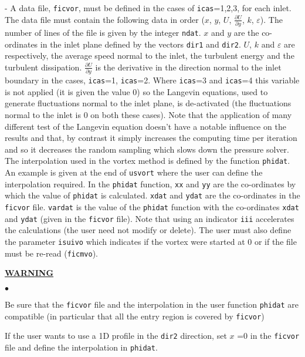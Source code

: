 {{{\begin{list}{-}{}
A data file, \texttt{ficvor}, must be defined in the cases of
\texttt{icas}=1,2,3, for each inlet. The data file must contain the following
data in order ($x$, $y$, $U$, $\displaystyle \frac{\partial U}
{\partial y}$, $k$, $\varepsilon$). The number of lines of the file is given by
the integer \texttt{ndat}. $x$ and $y$ are the co-ordinates in the inlet plane
defined by the vectors \texttt{dir1} and \texttt{dir2}. $U$, $k$ and
$\varepsilon$ are respectively, the average speed normal to the inlet,
the turbulent energy and the turbulent dissipation.
$\displaystyle \frac{\partial U}{\partial y}
$ is the derivative in the direction normal to the
 inlet boundary in the cases, \texttt{icas}=1, \texttt{icas}=2.
 Where \texttt{icas}=3 and \texttt{icas}=4 this variable is not applied
 (it is given the value 0) so the Langevin equations, used to generate
 fluctuations normal to the inlet plane, is de-activated
 (the fluctuations normal to the inlet is 0 on both these cases).
 Note that the application of
 many different test of the Langevin equation doesn't have a notable influence
 on the results and that, by contrast it simply increases the computing time per
 iteration and so it decreases the random sampling which slows down the pressure
 solver. The interpolation used in the vortex method is defined by the function
 \texttt{phidat}. An example is given at the end of \texttt{usvort} where the
 user can define the interpolation required. In the \texttt{phidat} function,
 \texttt{xx} and \texttt{yy} are the co-ordinates by which the value of
 \texttt{phidat} is calculated. \texttt{xdat} and \texttt{ydat} are the
 co-ordinates in the \texttt{ficvor} file. \texttt{vardat} is the
 value of the \texttt{phidat} function with the co-ordinates \texttt{xdat}
 and \texttt{ydat} (given in the \texttt{ficvor} file). Note that using an
 indicator \texttt{iii} accelerates the calculations (the user need not modify or delete).
 The user must also define the parameter \texttt{isuivo} which indicates if the
 vortex were started at 0 or if the file must be re-read (\texttt{ficmvo}).

\end{list}

{\bf \underline{WARNING}}
\begin{list}{$\bullet$}{}
\item Be sure that the \texttt{ficvor} file and  the interpolation in the user
  function \texttt{phidat} are compatible (in particular that all the entry
  region is covered by \texttt{ficvor})
\item If the user wants to use a 1D profile in the \texttt{dir2} direction,
 set $x$ =0 in the \texttt{ficvor} file and define the interpolation in
 \texttt{phidat}.
\end{list}

}}}
